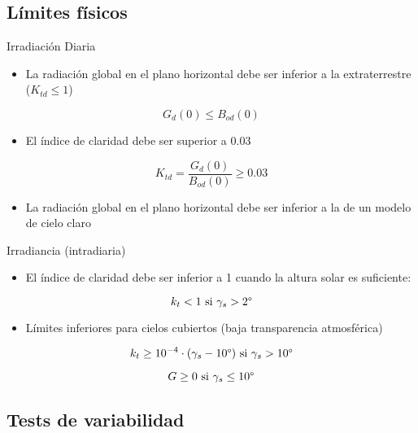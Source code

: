 \documentclass[aspectratio=169, usenames,svgnames,dvipsnames]{beamer}
\begin{document}
\subsection{Límites físicos}
\label{sec:org18ac795}
\begin{frame}[label={sec:org9aecc7d}]{Irradiación Diaria}
\begin{itemize}
\item La radiación global en el plano horizontal debe ser inferior a la extraterrestre (\(K_{td} \leq 1\))
\end{itemize}
\[
G_d(0) \leq B_{od}(0)
\]

\begin{itemize}
\item El índice de claridad debe ser superior a 0.03
\end{itemize}
\[
K_{td} = \frac{G_d(0)}{B_{od}(0)} \geq 0.03
\]

\begin{itemize}
\item La radiación global en el plano horizontal debe ser inferior a la de un modelo de cielo claro
\end{itemize}

\nocite{Younes.Claywell.ea2005, Estevez.Gavilan.ea2011, Geiger.Diabate.ea2002}
\end{frame}

\begin{frame}[label={sec:orgf09d6c0}]{Irradiancia (intradiaria)}
\begin{itemize}
\item El índice de claridad debe ser inferior a 1 cuando la altura solar es suficiente:
\end{itemize}
\[
k_t < 1  \text{ si } \gamma_s > 2\degree 
\]
\begin{itemize}
\item Límites inferiores para cielos cubiertos (baja transparencia atmosférica)
\end{itemize}
\[
k_t \geq 10^{-4} \cdot (\gamma_s - 10\degree)  \text{ si } \gamma_s > 10\degree
\]

\[
G \geq 0  \text{ si } \gamma_s \leq 10\degree
\]

\nocite{Journee.Bertrand2011}
\end{frame}

\subsection{Tests de variabilidad}
\label{sec:orgb20aeeb}
\end{document}
